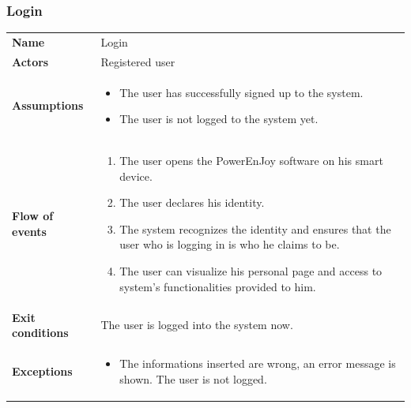 \documentclass[english]{article}
\begin{document}
		\subsubsection{Login}
		\begin{center}
		\begin{tabular}{l||p{10cm}}
		\textbf{Name} 
			& Login\\ [8px]
		\textbf{Actors} 
			& Registered user\\ [8px]
		\textbf{Assumptions} 
			& \begin{itemize}
				\item The user has successfully signed up to the system.
				\item The user is not logged to the system yet.
			\end{itemize}\\
		\textbf{Flow of events}
			& \begin{enumerate}
	 			\item The user opens the PowerEnJoy software on his smart device.
				\item The user declares his identity.
				\item The system recognizes the identity and ensures that the user who is logging in is who he claims to be.
				\item The user can visualize his personal page and access to system's functionalities provided to him.
			\end{enumerate}\\ 
		\textbf{Exit conditions}
			& The user is logged into the system now.\\ [8px]
		\textbf{Exceptions}
			& \begin{itemize}
				\item The informations inserted are wrong, an error message is shown. The user is not logged.
			\end{itemize}
		\end{tabular}
		\end{center}
		\noindent
\end{document}
